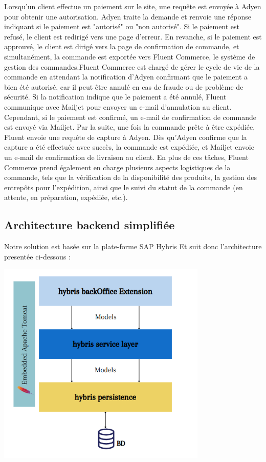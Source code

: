 Lorsqu'un client effectue un paiement sur le site, une requête est envoyée à Adyen pour obtenir une autorisation. Adyen traite la demande et renvoie une réponse indiquant si le paiement est "autorisé" ou "non autorisé". Si le paiement est refusé, le client est redirigé vers une page d'erreur. En revanche, si le paiement est approuvé, le client est dirigé vers la page de confirmation de commande, et simultanément, la commande est exportée vers Fluent Commerce, le système de gestion des commandes.Fluent Commerce est chargé de gérer le cycle de vie de la commande en attendant la notification d'Adyen confirmant que le paiement a bien été autorisé, car il peut être annulé en cas de fraude ou de problème de sécurité. Si la notification indique que le paiement a été annulé, Fluent communique avec Mailjet pour envoyer un e-mail d'annulation au client. Cependant, si le paiement est confirmé, un e-mail de confirmation de commande est envoyé via Mailjet. Par la suite, une fois la commande prête à être expédiée, Fluent envoie une requête de capture à Adyen. Dès qu'Adyen confirme que la capture a été effectuée avec succès, la commande est expédiée, et Mailjet envoie un e-mail de confirmation de livraison au client. En plus de ces tâches, Fluent Commerce prend également en charge plusieurs aspects logistiques de la commande, tels que la vérification de la disponibilité des produits, la gestion des entrepôts pour l’expédition, ainsi que le suivi du statut de la commande (en attente, en préparation, expédiée, etc.).

\subsection{Architecture backend simplifiée}
Notre solution est basée sur la plate-forme SAP Hybris Et suit donc l'architecture presentée ci-dessous :
\begin{center}
    \centering
    \includegraphics[width=10cm]{Figures/architecturebacend.png}
    \label{fig:processus}
\end{center}

